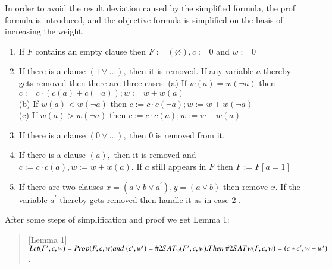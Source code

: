 \documentclass{sigchi}
\begin{document}
	In order to avoid the result deviation caused by the simplified formula, the prof formula is introduced, and the objective formula is simplified on the basis of increasing the weight.
\begin{enumerate}
\item If $F$ contains an empty clause then $F:=(\varnothing), c:=0$ and $w:=0$
\item If there is a clause $(1 \vee \ldots),$ then it is removed. If any variable $a$ thereby gets removed then there are three cases:
(a) If $w(a)=w(\neg a)$ then $c:=c \cdot(c(a)+c(\neg a)) ; w:=w+w(a)$\\
(b) If $w(a)<w(\neg a)$ then $c:=c \cdot c(\neg a) ; w:=w+w(\neg a)$\\
(c) If $w(a)>w(\neg a)$ then $c:=c \cdot c(a) ; w:=w+w(a)$
\item If there is a clause $(0 \vee \ldots),$ then 0 is removed from it.
\item If there is a clause $(a),$ then it is removed and $c:=c \cdot c(a), w:=w+w(a) .$ If $a$ still appears in $F$ then $F:=F[a=1]$
\item If there are two clauses $x=\left(a \vee b \vee a^{\prime}\right), y=(a \vee b)$ then remove $x$. If the variable $a^{\prime}$ thereby gets removed then handle it as in case 2 .
\end{enumerate}
After some steps of simplification and proof we get Lemma 1:
\begin{quote}[Lemma 1]
$Let({F}',c,w)=Prop(F,c,w)\\and\;({c}',{w}')=\#2SAT_{w}({F}',c,w).\\
Then\; \#2SATw(F ,c,w)=(c*{c}',w+{w}')$.
\end{quote}
\end{document}
